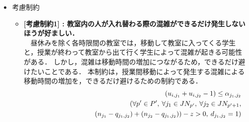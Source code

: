 \documentclass[12pt, a4paper, fleqn]{jreport}
\begin{document}
\begin{itemize}
\begin{itemize}
\begin{itemize}
\vspace{3.0mm}
\item {\bf  [絶対制約6] : 特別連続授業は同じ教室で開講されなければならない．}\\

\vspace{-5.0mm}
　特別連続授業（授業内容が同一，または非常に関連性の高い2限以上連続で開講される授業）は双方を受講している学生が多い．
従って，特別連続授業同一の教室で開講されるべきである．
本制約は，特別連続授業を同一教室で行うための制約である．

\vspace{-3.0mm}
\begin{eqnarray}
\label{hzettai6} 
&&u_{i_1,j_1}= u_{i_2,j_2} \quad \left(i \in I ,\: (j_1, j_2) \in L \right)
\end{eqnarray}

\vspace{3.0mm}
この制約は，先行研究の考慮制約1「特別連続授業は同じ教室で開講されることが好ましい」を改良したものである．
本研究では，この制約を絶対制約にすることで，大勢の学生が移動する可能性を低くしている．
また，この制約は，先行研究の考慮制約1「特別連続授業は同じ教室で開講されることが好ましい」で用いられている変数$\alpha_{j_1,j_2}$を用いずに定式化している．
従って，これは前章の問題点2「変数が多い」を解消している．
\end{itemize}

\vspace{5.0mm}
\item 考慮制約\\
\vspace{-5.0mm}
\begin{itemize}
\item {\bf  [考慮制約1] : 教室内の人が入れ替わる際の混雑ができるだけ発生しないほうが好ましい．}\\

\vspace{-5.0mm}
　昼休みを除く各時限間の教室では，移動して教室に入ってくる学生と，授業が終わって教室から出て行く学生によって混雑が起きる可能性がある．
しかし，混雑は移動時間の増加につながるため，できるだけ避けたいことである．
本制約は，授業間移動によって発生する混雑による移動時間の増加を，できるだけ避けるための制約である．\\

\vspace{-10.0mm}
\begin{eqnarray}
\label{hkouryo1} 
&&\left(u_{i,j_1} + u_{i,j_2} - 1\right) \le \alpha_{j_1, j_2}  \\
&&(\forall p' \in P', \: \forall j_1 \in JN_{p'}, \: \forall j_2 \in JN_{p'+1} ,\nonumber \\
&&\hspace{30mm} (n_{j_1} - q_{j_1, j_2}) + (n_{j_2} - q_{j_1, j_2})) - z > 0, \: d_{j_1, j_2} = 1)\nonumber 
\end{eqnarray}


\end{itemize}
\end{itemize}
\end{itemize}
\end{document}
